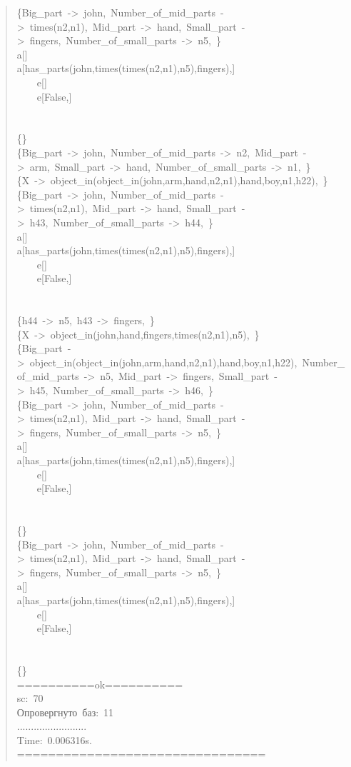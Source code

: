 \begin{quote}
\{Big\_part~->~john,~Number\_of\_mid\_parts~->~times(n2,n1),~Mid\_part~->~hand,~Small\_part~->~fingers,~Number\_of\_small\_parts~->~n5,~\}\\
a[]\\
a[has\_parts(john,times(times(n2,n1),n5),fingers),]\\
~~~~e[]\\
~~~~e[False,]\\
~\\
~\\
\{\}\\
\{Big\_part~->~john,~Number\_of\_mid\_parts~->~n2,~Mid\_part~->~arm,~Small\_part~->~hand,~Number\_of\_small\_parts~->~n1,~\}\\
\{X~->~object\_in(object\_in(john,arm,hand,n2,n1),hand,boy,n1,h22),~\}\\
\{Big\_part~->~john,~Number\_of\_mid\_parts~->~times(n2,n1),~Mid\_part~->~hand,~Small\_part~->~h43,~Number\_of\_small\_parts~->~h44,~\}\\
a[]\\
a[has\_parts(john,times(times(n2,n1),n5),fingers),]\\
~~~~e[]\\
~~~~e[False,]\\
~\\
~\\
\{h44~->~n5,~h43~->~fingers,~\}\\
\{X~->~object\_in(john,hand,fingers,times(n2,n1),n5),~\}\\
\{Big\_part~->~object\_in(object\_in(john,arm,hand,n2,n1),hand,boy,n1,h22),~Number\_of\_mid\_parts~->~n5,~Mid\_part~->~fingers,~Small\_part~->~h45,~Number\_of\_small\_parts~->~h46,~\}\\
\{Big\_part~->~john,~Number\_of\_mid\_parts~->~times(n2,n1),~Mid\_part~->~hand,~Small\_part~->~fingers,~Number\_of\_small\_parts~->~n5,~\}\\
a[]\\
a[has\_parts(john,times(times(n2,n1),n5),fingers),]\\
~~~~e[]\\
~~~~e[False,]\\
~\\
~\\
\{\}\\
\{Big\_part~->~john,~Number\_of\_mid\_parts~->~times(n2,n1),~Mid\_part~->~hand,~Small\_part~->~fingers,~Number\_of\_small\_parts~->~n5,~\}\\
a[]\\
a[has\_parts(john,times(times(n2,n1),n5),fingers),]\\
~~~~e[]\\
~~~~e[False,]\\
~\\
~\\
\{\}\\
==========ok==========\\
sc:~70\\
Опровергнуто~баз:~11\\
.........................\\
Time:~0.006316s.\\
================================
\end{quote}


